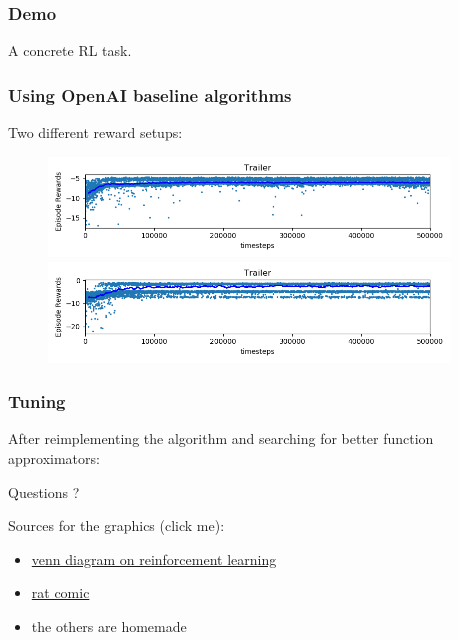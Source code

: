 \documentclass{beamer}
\begin{document}
\begin{frame}
\frametitle{Demo}
\begin{center}
A concrete RL task.
\end{center}
\end{frame}

\begin{frame}
\frametitle{Using OpenAI baseline algorithms}
\begin{center}
Two different reward setups:
\end{center}
\begin{figure}
\includegraphics[width=0.95\textwidth]{zero_rew.png}\\
\includegraphics[width=0.95\textwidth]{pos_rew.png}
\end{figure}
\end{frame}

\begin{frame}
\frametitle{Tuning}
After reimplementing the algorithm and searching for better function approximators:\\
\begin{center}
\end{center}
\end{frame}



\begin{frame}
\Huge{\centerline{Questions ?}}
\vspace{\fill}
\begin{footnotesize}
    Sources for the graphics (click me):
    \begin{itemize}
        \item \href{http://www.sharelatex.com}{venn diagram on reinforcement learning}
        \item \href{http://www2.smumn.edu/facpages/~dbucknam/}{rat comic}
        \item the others are homemade
    \end{itemize}
\end{footnotesize}

\end{frame}

\end{document}
